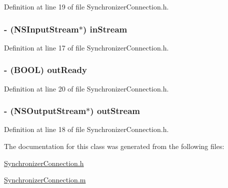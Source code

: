 Definition at line 19 of file SynchronizerConnection.h.

\hypertarget{interface_synchronizer_connection_a6518f57e11a87d0fa1592f43e6c09ef6}{
\subsubsection[{inStream}]{\setlength{\rightskip}{0pt plus 5cm}-\/ (NSInputStream$\ast$) inStream}}
\label{interface_synchronizer_connection_a6518f57e11a87d0fa1592f43e6c09ef6}


Definition at line 17 of file SynchronizerConnection.h.

\hypertarget{interface_synchronizer_connection_a64d91b9747d4876f20415079bb9d9f7f}{
\subsubsection[{outReady}]{\setlength{\rightskip}{0pt plus 5cm}-\/ (BOOL) outReady}}
\label{interface_synchronizer_connection_a64d91b9747d4876f20415079bb9d9f7f}


Definition at line 20 of file SynchronizerConnection.h.

\hypertarget{interface_synchronizer_connection_a40bb251ce886c4b07fe1c1e4c5107eeb}{
\subsubsection[{outStream}]{\setlength{\rightskip}{0pt plus 5cm}-\/ (NSOutputStream$\ast$) outStream}}
\label{interface_synchronizer_connection_a40bb251ce886c4b07fe1c1e4c5107eeb}


Definition at line 18 of file SynchronizerConnection.h.



The documentation for this class was generated from the following files:\begin{DoxyCompactItemize}
\item 
\hyperlink{_synchronizer_connection_8h}{SynchronizerConnection.h}\item 
\hyperlink{_synchronizer_connection_8m}{SynchronizerConnection.m}\end{DoxyCompactItemize}
